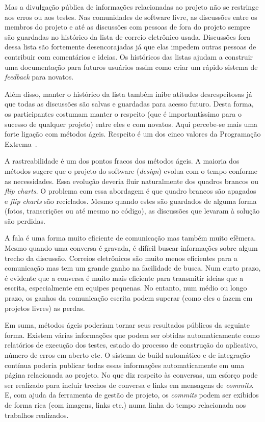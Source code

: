 Mas a divulgação pública de informações relacionadas ao projeto não se
restringe aos erros ou aos testes. Nas comunidades de software livre,
as discussões entre os membros do projeto e até as discussões com
pessoas de fora do projeto sempre são guardadas no histórico da lista
de correio eletrônico usada. Discussões fora dessa lista são
fortemente desencorajadas já que elas impedem outras pessoas de
contribuir com comentários e ideias. Os históricos das listas ajudam a
construir uma documentação para futuros usuários assim como criar um
rápido sistema de \emph{feedback} para novatos.

Além disso, manter o histórico da lista também inibe atitudes
desrespeitosas já que todas as discussões são salvas e guardadas para
acesso futuro. Desta forma, os participantes costumam manter o
respeito (que é importantíssimo para o sucesso de qualquer projeto)
entre eles e com novatos. Aqui percebe-se mais uma forte ligação com
métodos ágeis. Respeito é um dos cinco valores da Programação
Extrema~\cite{XP02}.

A rastreabilidade é um dos pontos fracos dos métodos ágeis. A maioria
dos métodos sugere que o projeto do software (\emph{design}) evolua
com o tempo conforme as necessidades. Essa evolução deveria fluir
naturalmente dos quadros brancos ou \emph{flip charts}. O problema com
essa abordagem é que quadro brancos são apagados e \emph{flip charts}
são reciclados.  Mesmo quando estes são guardados de alguma forma
(fotos, transcrições ou até mesmo no código), as discussões que
levaram à solução são perdidas.

A fala é uma forma muito eficiente de comunicação mas também muito
efêmera. Mesmo quando uma conversa é gravada, é difícil buscar
informações sobre algum trecho da discussão. Correios eletrônicos são
muito menos eficientes para a comunicação mas tem um grande ganho na
facilidade de busca. Num curto prazo, é evidente que a conversa é
muito mais eficiente para transmitir ideias que a escrita,
especialmente em equipes pequenas. No entanto, num médio ou longo
prazo, os ganhos da comunicação escrita podem superar (como eles o
fazem em projetos livres) as perdas.

Em suma, métodos ágeis poderiam tornar seus resultados públicos da
seguinte forma. Existem várias informações que podem ser obtidas
automaticamente como relatórios de execução dos testes, estado do
processo de construção do aplicativo, número de erros em aberto etc.  O
sistema de build automático e de integração contínua poderia publicar
todas essas informações automaticamente em uma página relacionada ao
projeto. No que diz respeito às conversas, um esforço pode ser
realizado para incluir trechos de conversa e links em mensagens de
\textit{commits}. E, com ajuda da ferramenta de gestão de projeto, os
\textit{commits} podem ser exibidos de forma rica (com imagens, links
etc.) numa linha do tempo relacionada aos trabalhos realizados.

